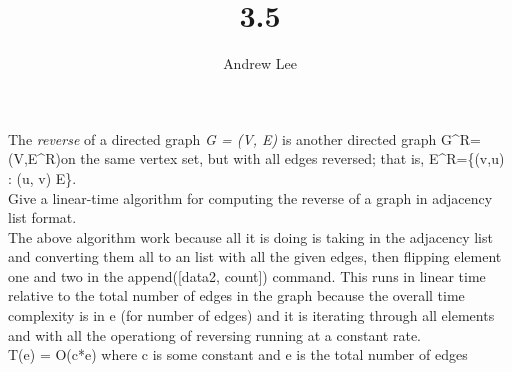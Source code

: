 \documentclass[10pt,a4paper,oneside]{article}
\begin{document}
\title{3.5}\author{Andrew Lee}\maketitle{}
\textrm{The \textit{reverse} of a directed graph \textit{G = (V, E)} is another directed graph \newline}
G^{R}=(V,E^{R})\textrm{on the same vertex set, but with all edges reversed; that is,\newline}
E^{R}=\{(v,u) : (u, v) \in E\}.\\
\textrm{Give a linear-time algorithm for computing the reverse of a graph in adjacency \newline list format.}\\



\textrm{The above algorithm work because all it is doing is taking in the adjacency list \newline and  converting them all to an list with all the \newline given edges, then flipping element one and two in the append([data2, count]) command. \newline This runs in linear time relative to the total number of edges in the graph because the overall \newline time complexity is in e (for number of edges) and it is iterating through all elements and \newline with all the operationg of reversing running at a constant rate.}\newline\\ T(e) = O(c*e) \textrm{ where c is some constant and e is the total number of edges}
\end{document}
